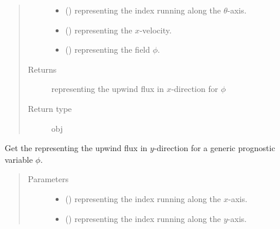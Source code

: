 \documentclass[letterpaper,10pt,english]{sphinxmanual}
\begin{document}
\begin{fulllineitems}
\begin{fulllineitems}
\begin{quote}
\begin{description}
\begin{itemize}
\item {} 
 () \textendash{}  representing the index running along the \(\theta\)-axis.

\item {} 
 () \textendash{}  representing the \(x\)-velocity.

\item {} 
 () \textendash{}  representing the field \(\phi\).

\end{itemize}

\item[{Returns}] \leavevmode
{} representing the upwind flux in \(x\)-direction for \(\phi\)

\item[{Return type}] \leavevmode
obj

\end{description}\end{quote}

\end{fulllineitems}


\begin{fulllineitems}
\label{\detokenize{api:dycore.flux_isentropic.FluxIsentropicUpwind._get_upwind_flux_y}}
Get the  representing the upwind flux in \(y\)-direction for a generic
prognostic variable \(\phi\).
\begin{quote}\begin{description}
\item[{Parameters}] \leavevmode\begin{itemize}
\item {} 
 () \textendash{}  representing the index running along the \(x\)-axis.

\item {} 
 () \textendash{}  representing the index running along the \(y\)-axis.


\end{itemize}
\end{description}
\end{quote}
\end{fulllineitems}
\end{fulllineitems}
\end{document}
